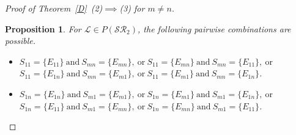 \documentclass[11pt,reqno]{amsart}
\theoremstyle{plain}
\newtheorem{prop}[theorem]{Proposition}
\theoremstyle{definition}
\numberwithin{equation}{section}
\begin{document}
\begin{proof}[Proof of Theorem~\ref{D}~(2)$\implies$(3) for $m\neq n$]
	\begin{prop}\label{SR_rectangle_S11Smn_S1nSm1_combo} 
		For $\mathcal{L}\in P(\mathcal{SR}_2)$, the following pairwise combinations are possible.
		\begin{itemize}
			\item[(i)] $S_{11}=\{E_{11}\} ~\text{and}~ S_{mn}=\{E_{mn}\}, ~\text{or}~ S_{11}=\{E_{mn}\} ~\text{and}~ S_{mn}=\{E_{11}\}, ~\text{or}$ \\
			$S_{11}=\{E_{1n}\} ~\text{and}~ S_{mn}=\{E_{m1}\}, ~\text{or}~ S_{11}=\{E_{m1}\} ~\text{and}~ S_{mn}=\{E_{1n}\}$.
			
			\item[(ii)] $S_{1n}=\{E_{1n}\} ~\text{and}~ S_{m1}=\{E_{m1}\},~\text{or}~ S_{1n}=\{E_{m1}\} ~\text{and}~ S_{m1}=\{E_{1n}\}, ~\text{or}$ \\
			$S_{1n}=\{E_{11}\} ~\text{and}~ S_{m1}=\{E_{mn}\},~\text{or}~ S_{1n}=\{E_{mn}\} ~\text{and}~ S_{m1}=\{E_{11}\}$.
		\end{itemize}
	\end{prop}


\end{proof}
\end{document}
